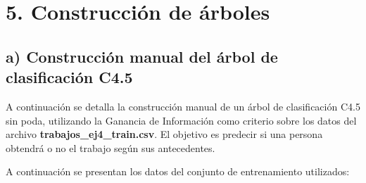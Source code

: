 \documentclass[11pt,a4paper]{article}
\begin{document}


\section*{5. Construcción de árboles}

\subsection*{a) Construcción manual del árbol de clasificación C4.5}

A continuación se detalla la construcción manual de un árbol de clasificación C4.5 sin poda, utilizando la Ganancia de Información como criterio sobre los datos del archivo \textbf{trabajos\_ej4\_train.csv}. El objetivo es predecir si una persona obtendrá o no el trabajo según sus antecedentes.

A continuación se presentan los datos del conjunto de entrenamiento utilizados:
\end{document}
